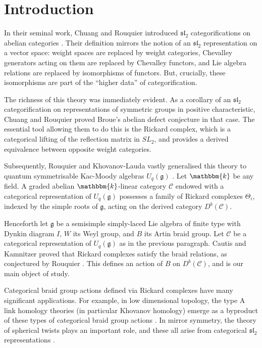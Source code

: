 \documentclass[11pt,reqno]{amsart}
\numberwithin{equation}{section}
\theoremstyle{definition}
\theoremstyle{named}
\newcommand{\cC}{\mathcal{C}}
\newcommand{\fg}{\mathfrak{g}}
\newcommand{\kk}{\mathbbm{k}}
\newcommand{\SL}{SL}
\newcommand{\fsl}{\mathfrak{sl}}
\begin{document}
\section{Introduction}
In their seminal work, Chuang and Rouquier introduced $\fsl_2$ categorifications on abelian categories \cite{CR}.  Their definition mirrors the notion of an $\fsl_2$ representation on a vector space: weight spaces are replaced by weight categories, Chevalley generators acting on them are replaced by Chevalley functors, and Lie algebra relations are replaced by isomorphisms of functors.  But, crucially, these isomorphisms are part of the ``higher data'' of categorification.

The richness of this theory was immediately evident.  As a corollary of an $\fsl_2$ categorification on representations of symmetric groups in positive characteristic, Chuang and Rouquier proved Broue's abelian defect conjecture in that case.  The essential tool allowing them to do this is the Rickard complex, which is a categorical lifting of the reflection matrix in $\SL_2$, and provides a derived equivalence between opposite weight categories.

Subsequently, Rouquier and Khovanov-Lauda vastly generalised this theory to  quantum symmetrisable Kac-Moody algebras $U_q(\fg)$ \cite{Rou2KM,KLI,KLII}.  Let $\kk$ be any field.  A graded abelian $\kk$-linear category $\cC$ endowed with a categorical representation of $U_q(\fg)$ possesses a family of Rickard complexes $\Theta_i$, indexed by the simple roots of $\fg$, acting on the derived category $D^b(\cC)$.  

Henceforth let $\fg$ be a semisimple simply-laced Lie algebra of finite type with Dynkin diagram $I$, $W$  its Weyl group, and $B$ its Artin braid group. Let $\cC$ be a categorical representation of $U_q(\fg)$ as in the previous paragraph.  Cautis and Kamnitzer proved that Rickard complexes satisfy the braid relations, as conjectured by Rouquier \cite{CK3}.  This defines an action of $B$ on $D^b(\cC)$, and is our main object of study.    

Categorical braid group actions defined via Rickard complexes have many significant applications.  For example, in low dimensional topology, the type A link homology theories (in particular Khovanov homology) emerge as a byproduct of these types of categorical braid group actions \cite{CK, CKII, LQR}.  In mirror symmetry, the theory of spherical twists plays an important role, and these all arise from categorical $\fsl_2$ representations \cite{ST01}.  
\end{document}
